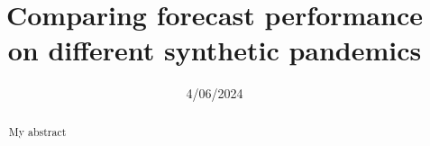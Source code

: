 \documentclass{article}
\title{Comparing forecast performance on different synthetic pandemics }
\author{}
\date{4/06/2024}
\begin{document}
\maketitle


\begin{abstract}

    My abstract 

\end{abstract}








\printbibliography
\end{document}
